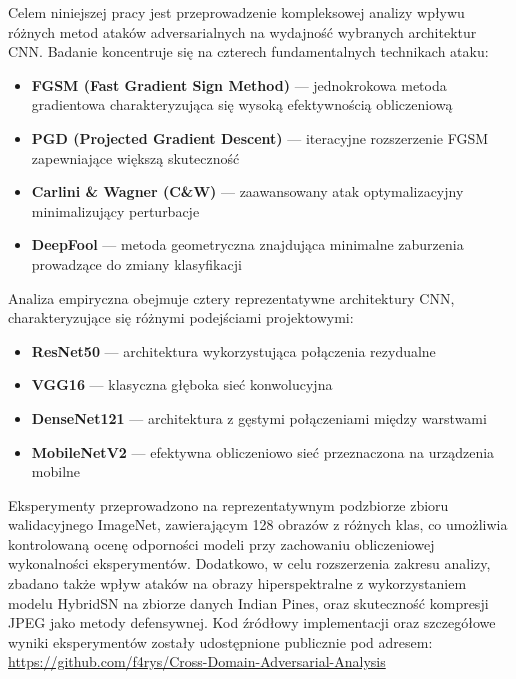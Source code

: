 \documentclass[12pt]{article}
\begin{document}
Celem niniejszej pracy jest przeprowadzenie kompleksowej analizy wpływu różnych metod ataków adversarialnych na wydajność wybranych architektur CNN. Badanie koncentruje się na czterech fundamentalnych technikach ataku:

\begin{itemize}
    \item \textbf{FGSM (Fast Gradient Sign Method)} \supercite{goodfellow2014explaining} --- jednokrokowa metoda gradientowa charakteryzująca się wysoką efektywnością obliczeniową
    \item \textbf{PGD (Projected Gradient Descent)} \supercite{madry2017towards} --- iteracyjne rozszerzenie FGSM zapewniające większą skuteczność
    \item \textbf{Carlini \& Wagner (C\&W)} \supercite{carlini2017towards} --- zaawansowany atak optymalizacyjny minimalizujący perturbacje
    \item \textbf{DeepFool} \supercite{moosavi2016deepfool} --- metoda geometryczna znajdująca minimalne zaburzenia prowadzące do zmiany klasyfikacji
\end{itemize}

Analiza empiryczna obejmuje cztery reprezentatywne architektury CNN, charakteryzujące się różnymi podejściami projektowymi:

\begin{itemize}
    \item \textbf{ResNet50} --- architektura wykorzystująca połączenia rezydualne
    \item \textbf{VGG16} --- klasyczna głęboka sieć konwolucyjna
    \item \textbf{DenseNet121} --- architektura z gęstymi połączeniami między warstwami
    \item \textbf{MobileNetV2} --- efektywna obliczeniowo sieć przeznaczona na urządzenia mobilne
\end{itemize}

Eksperymenty przeprowadzono na reprezentatywnym podzbiorze zbioru walidacyjnego ImageNet, zawierającym 128 obrazów z różnych klas, co umożliwia kontrolowaną ocenę odporności modeli przy zachowaniu obliczeniowej wykonalności eksperymentów. Dodatkowo, w celu rozszerzenia zakresu analizy, zbadano także wpływ ataków na obrazy hiperspektralne z wykorzystaniem modelu HybridSN na zbiorze danych Indian Pines, oraz skuteczność kompresji JPEG jako metody defensywnej. Kod źródłowy implementacji oraz szczegółowe wyniki eksperymentów zostały udostępnione publicznie pod adresem: \url{https://github.com/f4rys/Cross-Domain-Adversarial-Analysis}
\end{document}
